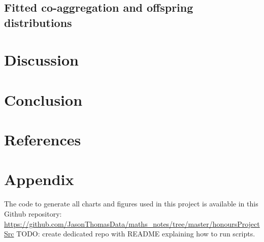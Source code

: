 \documentclass{article}
\begin{document}
\subsection{Fitted co-aggregation and offspring distributions}



\newpage

\section{Discussion}

\section{Conclusion}
 
\newpage

\nocite{*}

\section{References}
\printbibliography[heading=none]

\section{Appendix}
The code to generate all charts and figures used in this project is available in this Github repository: \url{https://github.com/JasonThomasData/maths_notes/tree/master/honoursProjectSrc}
TODO: create dedicated repo with README explaining how to run scripts.
\end{document}
